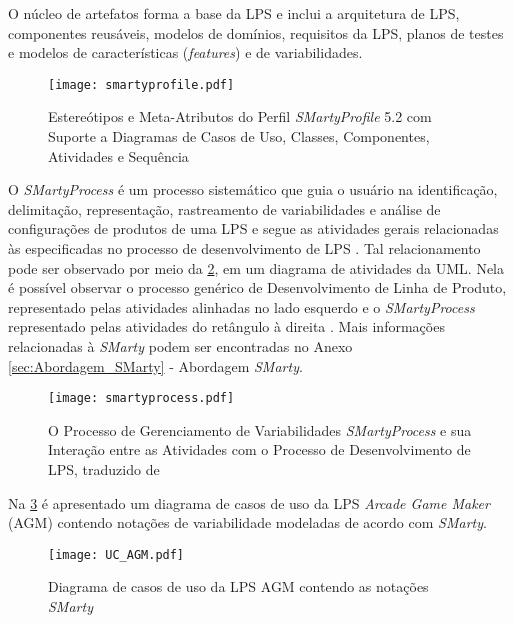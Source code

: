 O núcleo de artefatos forma a base da LPS e inclui a arquitetura de LPS, componentes reusáveis, modelos de domínios, requisitos da LPS, planos de testes e modelos de características (\textit{features}) e de variabilidades.


\begin{landscape}
	
	\begin{figure}[h!]
		\centering
		\texttt{[image: smartyprofile.pdf]}
		\caption{ Estereótipos e Meta-Atributos do Perfil \textit{SMartyProfile} 5.2 com Suporte a Diagramas de Casos de Uso, Classes, Componentes, Atividades e Sequência \cite{bera2015evidence}}
		\label{fig:smartyprofile}
	\end{figure}
	
	
\end{landscape}

O \textit{SMartyProcess} é um processo sistemático que guia o usuário na identificação, delimitação, representação, rastreamento de variabilidades e análise de configurações de produtos de uma LPS e segue as atividades gerais relacionadas às especificadas no processo de desenvolvimento de LPS \cite{pohl2005software}. Tal relacionamento pode ser observado por meio da \ref{fig:smartyprocess}, em um diagrama de atividades da UML. Nela é possível observar o processo genérico de Desenvolvimento de Linha de Produto, representado pelas atividades alinhadas no lado esquerdo e o \textit{SMartyProcess} representado pelas atividades do retângulo à direita \cite{de2005variability}. Mais informações relacionadas à \textit{SMarty} podem ser encontradas no Anexo \ref{sec:Abordagem_SMarty} - Abordagem \textit{SMarty}.


\begin{figure}[h!]
	\centering
	\texttt{[image: smartyprocess.pdf]}
	\caption{ O Processo de Gerenciamento de Variabilidades \textit{SMartyProcess} e sua Interação entre as Atividades com o Processo de Desenvolvimento de LPS, traduzido de \citet{de2005variability}}
	\label{fig:smartyprocess}
\end{figure}

Na \ref{fig:usecase} é apresentado um diagrama de casos de uso da LPS \textit{Arcade Game Maker} (AGM) \cite{seiagm} contendo notações de variabilidade modeladas de acordo com \textit{SMarty}.

\begin{figure}[h!]
	\centering
	\texttt{[image: UC\_AGM.pdf]}
	\caption{Diagrama de casos de uso da LPS AGM contendo as notações \textit{SMarty} \cite{MarcolinoSEKE2013}}
	\label{fig:usecase}
\end{figure}

